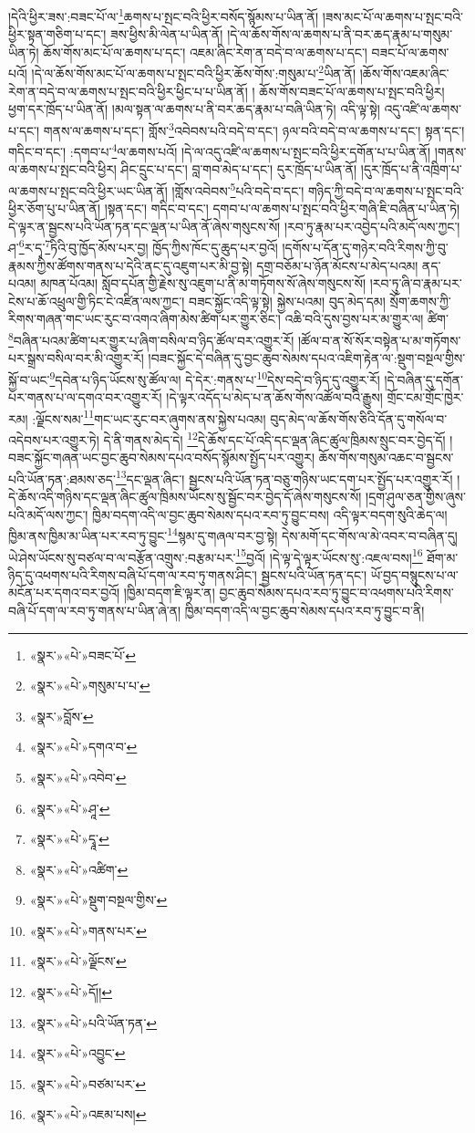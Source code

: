 །དེའི་ཕྱིར་ཟས་:བཟང་པོ་ལ་\footnote{«སྣར་»«པེ་»བཟང་པོ་}ཆགས་པ་སྤང་བའི་ཕྱིར་བསོད་སྙོམས་པ་ཡིན་ནོ། །ཟས་མང་པོ་ལ་ཆགས་པ་སྤང་བའི་ཕྱིར་སྟན་གཅིག་པ་དང་། ཟས་ཕྱིས་མི་ལེན་པ་ཡིན་ནོ། །དེ་ལ་ཆོས་གོས་ལ་ཆགས་པ་ནི་བར་ཆད་རྣམ་པ་གསུམ་ཡིན་ཏེ། ཆོས་གོས་མང་པོ་ལ་ཆགས་པ་དང་། འཇམ་ཞིང་རེག་ན་བདེ་བ་ལ་ཆགས་པ་དང་། བཟང་པོ་ལ་ཆགས་པའོ། །དེ་ལ་ཆོས་གོས་མང་པོ་ལ་ཆགས་པ་སྤང་བའི་ཕྱིར་ཆོས་གོས་:གསུམ་པ་\footnote{«སྣར་»«པེ་»གསུམ་པ་པ་}ཡིན་ནོ། །ཆོས་གོས་འཇམ་ཞིང་རེག་ན་བདེ་བ་ལ་ཆགས་པ་སྤང་བའི་ཕྱིར་ཕྱིང་པ་པ་ཡིན་ནོ། །
ཆོས་གོས་བཟང་པོ་ལ་ཆགས་པ་སྤང་བའི་ཕྱིར། ཕྱག་དར་ཁྲོད་པ་ཡིན་ནོ། །མལ་སྟན་ལ་ཆགས་པ་ནི་བར་ཆད་རྣམ་པ་བཞི་ཡིན་ཏེ། འདི་ལྟ་སྟེ། འདུ་འཛི་ལ་ཆགས་པ་དང་། གནས་ལ་ཆགས་པ་དང་། གློས་\footnote{«སྣར་»བློས་}འབེབས་པའི་བདེ་བ་དང་། ཉལ་བའི་བདེ་བ་ལ་ཆགས་པ་དང་། སྟན་དང་། གདིང་བ་དང་། :དགབ་པ་\footnote{«སྣར་»«པེ་»དགའ་བ་}ལ་ཆགས་པའོ། །དེ་ལ་འདུ་འཛི་ལ་ཆགས་པ་སྤང་བའི་ཕྱིར་དགོན་པ་པ་ཡིན་ནོ། །གནས་ལ་ཆགས་པ་སྤང་བའི་ཕྱིར། ཤིང་དྲུང་པ་དང་། བླ་གབ་མེད་པ་དང་། དུར་ཁྲོད་པ་ཡིན་ནོ། །དུར་ཁྲོད་པ་ནི་འཁྲིག་པ་ལ་ཆགས་པ་སྤང་བའི་ཕྱིར་ཡང་ཡིན་ནོ། །གློས་འབེབས་\footnote{«སྣར་»«པེ་»འབེབ་}པའི་བདེ་བ་དང་། གཉིད་ཀྱི་བདེ་བ་ལ་ཆགས་པ་སྤང་བའི་ཕྱིར་ཅོག་པུ་པ་ཡིན་ནོ། །སྟན་དང་། གདིང་བ་དང་། དགབ་པ་ལ་ཆགས་པ་སྤང་བའི་ཕྱིར་གཞི་ཇི་བཞིན་པ་ཡིན་ཏེ། དེ་ལྟར་ན་སྦྱངས་པའི་ཡོན་ཏན་དང་ལྡན་པ་ཡིན་ནོ་ཞེས་གསུངས་སོ། །རབ་ཏུ་རྣམ་པར་འབྱེད་པའི་མདོ་ལས་ཀྱང་། ཤ་\footnote{«སྣར་»«པེ་»ཤཱ་}ར་དྭ་\footnote{«སྣར་»«པེ་»དྭཱ་}ཏིའི་བུ་ཁྱོད་མོས་པར་བྱ། ཁྱོད་ཀྱིས་ཁོང་དུ་ཆུད་པར་བྱའོ། །དགོས་པ་དོན་དུ་གཉེར་བའི་རིགས་ཀྱི་བུ་རྣམས་ཀྱིས་ཚོགས་གནས་པ་དེའི་ནང་དུ་འཇུག་པར་མི་བྱ་སྟེ། དགྲ་བཅོམ་པ་ཉོན་མོངས་པ་མེད་པའམ། ནད་པའམ། མཁན་པོའམ། སློབ་དཔོན་གྱི་རྗེས་སུ་འཇུག་པ་ནི་མ་གཏོགས་སོ་ཞེས་གསུངས་སོ། །རབ་ཏུ་ཞི་བ་རྣམ་པར་ངེས་པ་ཆོ་འཕྲུལ་གྱི་ཏིང་ངེ་འཛིན་ལས་ཀྱང་། བཟང་སྐྱོང་འདི་ལྟ་སྟེ། སྐྱེས་པའམ། བུད་མེད་དམ། སྲོག་ཆགས་ཀྱི་རིགས་གཞན་གང་ཡང་རུང་བ་འགའ་ཞིག་མེས་ཚིག་པར་གྱུར་ཅིང་། འཆི་བའི་དུས་བྱས་པར་མ་གྱུར་ལ། ཚིག་\footnote{«སྣར་»«པེ་»འཚིག་}བཞིན་པའམ་ཚིག་པར་གྱུར་པ་ཞིག་བསིལ་བ་ཉིད་ཚོལ་བར་འགྱུར་རོ། །ཚོལ་བ་ན་སོ་སོར་བསྟེན་པ་མ་གཏོགས་པར་སྒྲས་བསིལ་བར་མི་འགྱུར་རོ། །བཟང་སྐྱོང་དེ་བཞིན་དུ་བྱང་ཆུབ་སེམས་དཔའ་འཇིག་རྟེན་ལ་:སྡུག་བསྔལ་གྱིས་སྐྱོ་བ་ཡང་\footnote{«སྣར་»«པེ་»སྡུག་བསྔལ་གྱིས་}དབེན་པ་ཉིད་ཡོངས་སུ་ཚོལ་ལ། དེ་དེར་:གནས་པ་\footnote{«སྣར་»«པེ་»གནས་པར་}དེས་བདེ་བ་ཉིད་དུ་འགྱུར་རོ། །དེ་བཞིན་དུ་དགོན་པར་གནས་པ་ལ་དགའ་བར་འགྱུར་རོ། །དེ་ལྟར་འདོད་པ་མེད་པ་ན་ཆོས་གོས་འཚོལ་བའི་རྒྱུས། གྲོང་ངམ་གྲོང་ཁྱེར་རམ། :ལྗོངས་སམ་\footnote{«སྣར་»«པེ་»ལྗོངས་}གང་ཡང་རུང་བར་ཞུགས་ནས་སྐྱེས་པའམ། བུད་མེད་ལ་ཆོས་གོས་ཅིའི་དོན་དུ་གསོལ་བ་འདེབས་པར་འགྱུར་ཏེ། དེ་ནི་གནས་མེད་དེ། \footnote{«སྣར་»«པེ་»དོ།། }དེ་ཆོས་དང་པོ་འདི་དང་ལྡན་ཞིང་ཚུལ་ཁྲིམས་སྲུང་བར་བྱེད་དོ། །བཟང་སྐྱོང་གཞན་ཡང་བྱང་ཆུབ་སེམས་དཔའ་བསོད་སྙོམས་སྤྱོད་པར་འགྱུར། ཆོས་གོས་གསུམ་འཆང་བ་སྦྱངས་པའི་ཡོན་ཏན་:ཐམས་ཅད་\footnote{«སྣར་»«པེ་»པའི་ཡོན་ཏན་}དང་ལྡན་ཞིང་། སྦྱངས་པའི་ཡོན་ཏན་བཅུ་གཉིས་ཡང་དག་པར་སྤྱོད་པར་འགྱུར་རོ། །དེ་ཆོས་འདི་གཉིས་དང་ལྡན་ཞིང་ཚུལ་ཁྲིམས་ཡོངས་སུ་སྦྱོང་བར་བྱེད་དོ་ཞེས་གསུངས་སོ། །དྲག་ཤུལ་ཅན་གྱིས་ཞུས་པའི་མདོ་ལས་ཀྱང་། ཁྱིམ་བདག་འདི་ལ་བྱང་ཆུབ་སེམས་དཔའ་རབ་ཏུ་བྱུང་བས། འདི་ལྟར་བདག་སུའི་ཆེད་ལ། ཁྱིམ་ནས་ཁྱིམ་མ་ཡིན་པར་རབ་ཏུ་བྱུང་\footnote{«སྣར་»«པེ་»འབྱུང་}སྙམ་དུ་གཞལ་བར་བྱ་སྟེ། དེས་མགོ་དང་གོས་ལ་མེ་འབར་བ་བཞིན་དུ། ཡེ་ཤེས་ཡོངས་སུ་བཙལ་བ་ལ་བརྩོན་འགྲུས་:བརྩམ་པར་\footnote{«སྣར་»«པེ་»བཙམ་པར་}བྱའོ། །དེ་ལྟ་དེ་ལྟར་ཡོངས་སུ་:འཇལ་བས།\footnote{«སྣར་»«པེ་»འཇམ་པས།} ཐོག་མ་ཉིད་དུ་འཕགས་པའི་རིགས་བཞི་པོ་དག་ལ་རབ་ཏུ་གནས་ཤིང་། སྦྱངས་པའི་ཡོན་ཏན་དང་། ཡོ་བྱད་བསྙུངས་པ་ལ་མངོན་པར་དགའ་བར་བྱའོ། །ཁྱིམ་བདག་ཇི་ལྟར་ན། བྱང་ཆུབ་སེམས་དཔའ་རབ་ཏུ་བྱུང་བ་འཕགས་པའི་རིགས་བཞི་པོ་དག་ལ་རབ་ཏུ་གནས་པ་ཡིན་ཞེ་ན། ཁྱིམ་བདག་འདི་ལ་བྱང་ཆུབ་སེམས་དཔའ་རབ་ཏུ་བྱུང་བ་ནི། 